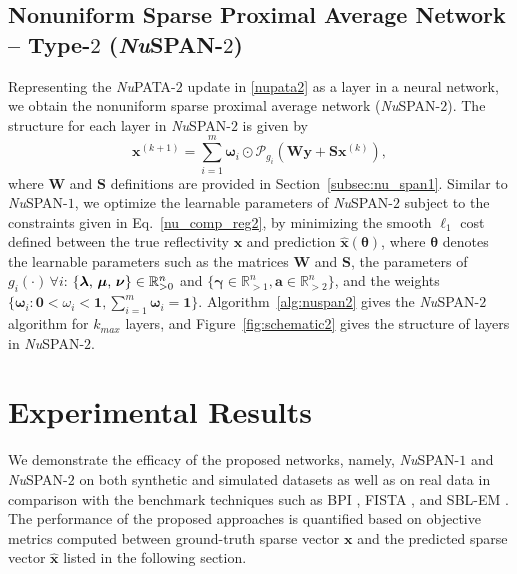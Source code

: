 \documentclass[journal]{IEEEtran}
\begin{document}
\subsection{Nonuniform Sparse Proximal Average Network -- Type-\texorpdfstring{$2$}{2} ({\it Nu}SPAN-\texorpdfstring{$2$}{2})}
\label{subsec:nu_span2}%
%
Representing the {\it Nu}PATA-$2$ update in \eqref{nupata2} as a layer in a neural network, we obtain the nonuniform sparse proximal average network ({\it Nu}SPAN-$2$). The structure for each layer in {\it Nu}SPAN-$2$ is given by
%
\begin{equation}
    \boldsymbol{x}^{(k+1)} = \sum_{i = 1}^m \boldsymbol{\omega}_{i} \odot \mathcal{P}_{g_{i}} ( \mathbf{W} \boldsymbol{y} + \mathbf{S} \boldsymbol{x}^{(k)}),
\end{equation}
%
where \( \mathbf{W} \) and \( \mathbf{S} \) definitions are provided in Section~\ref{subsec:nu_span1}. Similar to {\it Nu}SPAN-$1$, we optimize the learnable parameters of {\it Nu}SPAN-$2$ subject to the constraints given in Eq.~\eqref{nu_comp_reg2}, by minimizing the smooth $\ell_1$ cost defined between the true reflectivity $\boldsymbol{x}$ and prediction $\hat{\boldsymbol{x}}(\boldsymbol{\theta})$, where $\boldsymbol{\theta}$ denotes the learnable parameters such as the matrices $\mathbf{W}$ and $\mathbf{S}$, the parameters of $g_{i}(\cdot) \, \forall i$: $\{\boldsymbol{\lambda$, $\mu$, $\nu}\} \in \mathbb{R}^n_{>0}$ and $\{\boldsymbol{\gamma}\in \mathbb{R}^n_{>1}, \boldsymbol{a} \in \mathbb{R}^n_{>2} \}$, and the weights $\{\boldsymbol{\omega}_{i}: \boldsymbol{0} < \omega_{i} < \boldsymbol{1}, \sum_{i=1}^m \boldsymbol{\omega}_{i} = \boldsymbol{1}\}$. Algorithm~\ref{alg:nuspan2} gives the {\it Nu}SPAN-$2$ algorithm for $k_{max}$ layers, and Figure~\ref{fig:schematic2} gives the structure of layers in {\it Nu}SPAN-$2$. 

\section{Experimental Results}
\label{sec:results}
We demonstrate the efficacy of the proposed networks, namely, {\it Nu}SPAN-$1$ and {\it Nu}SPAN-$2$ on both synthetic and simulated datasets as well as on real data in comparison with the benchmark techniques such as BPI \cite{chen2001atomic, zhang2011seismic}, FISTA \cite{beck2009fast, perez2012inversion}, and SBL-EM \cite{wipf2004sparse, yuan2019seismic}. The performance of the proposed approaches is quantified based on objective metrics computed between ground-truth sparse vector $\boldsymbol{x}$ and the predicted sparse vector $\hat{\boldsymbol{x}}$ listed in the following section.
\end{document}
